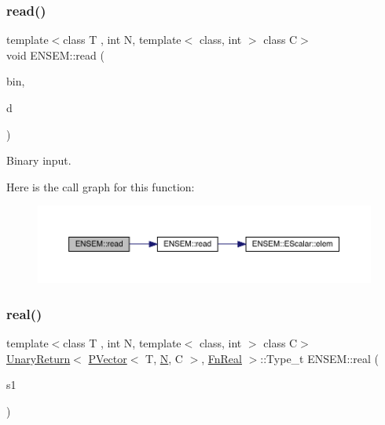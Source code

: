 \subsubsection{\texorpdfstring{read()}{read()}}
{\footnotesize\ttfamily template$<$class T , int N, template$<$ class, int $>$ class C$>$ \\
void E\+N\+S\+E\+M\+::read (\begin{DoxyParamCaption}\item[{\mbox{\hyperlink{classADATIO_1_1BinaryReader}{A\+D\+A\+T\+I\+O\+::\+Binary\+Reader}} \&}]{bin,  }\item[{\mbox{\hyperlink{classENSEM_1_1PVector}{P\+Vector}}$<$ T, \mbox{\hyperlink{operator__name__util_8cc_a7722c8ecbb62d99aee7ce68b1752f337}{N}}, C $>$ \&}]{d }\end{DoxyParamCaption})\hspace{0.3cm}{\ttfamily [inline]}}



Binary input. 

Here is the call graph for this function\+:\nopagebreak
\begin{figure}[H]
\begin{center}
\leavevmode
\includegraphics[width=350pt]{d3/dc4/group__primvector_ga7490c5f7d1484d1500da031d977a1217_cgraph}
\end{center}
\end{figure}
\mbox{\label{group__primvector_ga9198795b4cc43e6d68f0273dd10b3aa1}} 
\subsubsection{\texorpdfstring{real()}{real()}}
{\footnotesize\ttfamily template$<$class T , int N, template$<$ class, int $>$ class C$>$ \\
\mbox{\hyperlink{structENSEM_1_1UnaryReturn}{Unary\+Return}}$<$ \mbox{\hyperlink{classENSEM_1_1PVector}{P\+Vector}}$<$ T, \mbox{\hyperlink{operator__name__util_8cc_a7722c8ecbb62d99aee7ce68b1752f337}{N}}, C $>$, \mbox{\hyperlink{structENSEM_1_1FnReal}{Fn\+Real}} $>$\+::Type\+\_\+t E\+N\+S\+E\+M\+::real (\begin{DoxyParamCaption}\item[{const \mbox{\hyperlink{classENSEM_1_1PVector}{P\+Vector}}$<$ T, \mbox{\hyperlink{operator__name__util_8cc_a7722c8ecbb62d99aee7ce68b1752f337}{N}}, C $>$ \&}]{s1 }\end{DoxyParamCaption})\hspace{0.3cm}{\ttfamily [inline]}}



